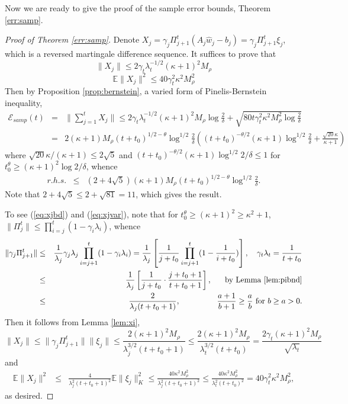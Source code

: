 \documentclass[twoside,11pt]{amsart}
\theoremstyle{theorem}
\theoremstyle{definition}
\theoremstyle{remark}
\newcommand{\DS}{\displaystyle}
\def\E{{\mathbb E}}        %
\def\w{\hat{w}}
\def\Err{{\mathscr E}}
\def\t{t_0}
\def\la{\lambda}
\def\ka{\kappa}
\def\ga{\gamma}
\begin{document}
Now we are ready to give the proof of the sample error bounds, Theorem \ref{err:samp}. 

\begin{proof}[Proof of Theorem \ref{err:samp}] Denote $X_j=\gamma_j \Pi_{j+1}^t ( A_j \w_j - b_j)=\gamma_j \Pi_{j+1}^t\xi_j$, which is a reversed martingale difference sequence.
It suffices to prove that
\begin{equation}\label{eq:xjbd}
\|X_j\|\leq 2 \ga_t \la_t^{-1/2}(\kappa+1)^2 M_\rho 
\end{equation}
\begin{equation}\label{eq:xjvar}
\E\|X_j\|^2 \leq 40\ga_t^2 \kappa^2 M_\rho^2
\end{equation}
Then by Proposition \ref{prop:bernstein}, a varied form of Pinelis-Bernstein inequality,
\begin{eqnarray*}
\Err_{samp}(t) & = & \|\sum_{j=1}^t X_j\|  \leq 2 \ga_t \la_t^{-1/2} (\kappa+1)^2 M_\rho \log \frac{2}{\delta} + \sqrt{80t \ga_t^2 \kappa^2 M_\rho^2 \log \frac{2}{\delta}} \\
& = & 2(\kappa+1) M_\rho (t+\t)^{1/2-\theta} \log^{1/2} \frac{2}{\delta} \left( (t+\t)^{-\theta/2} (\ka+1) \log^{1/2} \frac{2}{\delta} + \frac{\sqrt{20}\ka }{\kappa+1} \right) 
\end{eqnarray*}
where $\sqrt{20}\ka /(\kappa+1)\leq 2\sqrt{5}$ and $(t+\t)^{-\theta/2} (\ka+1) \log^{1/2} 2/\delta\leq 1$ for $\t^\theta \geq (\ka+1)^2 \log 2/\delta$, whence
\begin{eqnarray*}
r.h.s. & \leq & (2+4\sqrt{5}) (\kappa+1) M_\rho (t+\t)^{1/2-\theta} \log^{1/2} \frac{2}{\delta}.
\end{eqnarray*}
Note that $2+4\sqrt{5} \leq 2 + \sqrt{81}= 11$, which gives the result.

To see (\ref{eq:xjbd}) and (\ref{eq:xjvar}), note that for $\t^\theta\geq (\ka+1)^2  \geq \kappa^2+1$, 
$\|\Pi_j^t\| \leq \prod_{i=j}^t ( 1- \ga_i \la_i)$, whence
\begin{eqnarray*} 
\|\gamma_j \Pi_{j+1}^t\| & \leq & \frac{1}{\la_j} \ga_j \la_j \prod_{i=j+1}^t ( 1- \ga_i \la_i)  = \frac{1}{\la_j} \left[ \frac{1}{j+\t} \prod_{i=j+1}^t (1 - \frac{1}{i+\t})\right] , \ \ \ \ga_t \la_t = \frac{1}{t+\t} \nonumber \\
& \leq & \frac{1}{\la_j} \left[ \frac{1}{j+\t} \cdot  \frac{j+\t+1}{t+\t+1}\right], \ \ \ \ \ \mbox{by Lemma \ref{lem:pibnd}} \nonumber \\
& \leq & \frac{2}{\la_j (t+\t+1)}, \ \ \ \ \ \ \ \ \ \ \ \  \ \ \mbox{$\DS \frac{a+1}{b+1}\geq \frac{a}{b}$ for $b\geq a >0$}. \label{eq:samp1}
\end{eqnarray*}
Then it follows from Lemma \ref{lem:xi},
\[
\|X_j\|  \leq \|\ga_j \Pi_{j+1}^t\| \|\xi_j\| \leq \frac{2(\kappa+1)^2 M_\rho}{\la_j^{3/2} (t+\t+1)} \leq  
\frac{2(\kappa+1)^2 M_\rho}{\la_t^{3/2} (t+\t)} = \frac{2 \ga_t(\kappa+1)^2 M_\rho}{\sqrt{\la_t}}
\]
and
\begin{eqnarray*}
\E\|X_j\|^2 & \leq &  \frac{4}{\la_j^2 (t+\t+1)^2} \E\|\xi_j\|_K^2 \leq  \frac{40 \kappa^2 M_\rho^2}{\la_j^2 (t+\t+1)^2}   \leq \frac{40\kappa^2 M_\rho^2}{\la_t^2(t+\t)^2} 
= 40\ga_t^2 \kappa^2 M_\rho^2,
\end{eqnarray*}
as desired. 
\end{proof}
\end{document}
